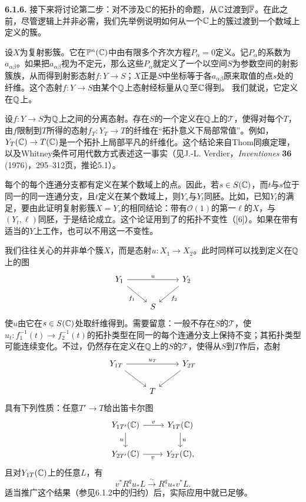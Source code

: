 \par\medskip\noindent\textbf{6.1.6.} 接下来将讨论第二步：对不涉及$\mathbb C$的拓扑的命题，从$\mathbb C$过渡到$\overline{\mathbb F}$。在此之前，尽管逻辑上并非必需，我们先举例说明如何从一个$\mathbb C$上的簇过渡到一个数域上定义的簇。

设$X$为复射影簇。它在$\mathbb P^n(\mathbb C)$中由有限多个齐次方程$P_\alpha=0$定义。记$P_\alpha$的系数为$a_{\alpha\beta}$。如果把$a_{\alpha\beta}$视为不定元，那么这些$P_\alpha$就定义了一个以空间$S$为参数空间的射影簇族，从而得到射影态射$f:Y\to S$；$X$正是$S$中坐标等于各$a_{\alpha\beta}$原来取值的点$s$处的纤维。这个态射$f:Y\to S$由某个$\mathbb Q$上态射经标量从$\mathbb Q$至$\mathbb C$得到。
我们就说，它定义在$\mathbb Q$上。

设$f:Y\to S$为$\mathbb Q$上之间的分离态射。存在$S$的一个定义在$\mathbb Q$上的$\mathcal T$，使得对每个$T$，由$f$限制到$T$所得的态射$f_T:Y_T\to T$的纤维在“拓扑意义下局部常值”。例如，$Y_T(\mathbb C)\to T(\mathbb C)$是一个拓扑上局部平凡的纤维化。这个结论来自Thom同痕定理，以及Whitney条件可用代数方式表述这一事实（见J.-L. Verdier，\emph{Inventiones} \textbf{36} (1976)，295--312页，推论5.1）。

每个的每个连通分支都有定义在某个数域上的点。因此，若$s\in S(\mathbb C)$，而$t$与$s$位于同一的同一连通分支，且$t$定义在某个数域上，则$Y_s$与$Y_t$同胚。比如，已知$Y_t$的满足，要由此证明复射影簇$X=Y_s$的相同结论：带有$\mathcal O(1)$的第一$\ell$的$X$，与$(Y_t,\ell)$同胚，于是结论成立。这个论证用到了的拓扑不变性（[6]）。如果在带有适当的$Y$上工作，也可以不用这一不变性。

我们往往关心的并非单个簇$X$，而是态射$u:X_1\to X_2$。此时同样可以找到定义在$\mathbb Q$上的图
\[
\begin{tikzcd}[ampersand replacement=\&]
Y_1\arrow[rr,"{u}"]\arrow[dr,"{f_1}"']\&\&Y_2\arrow[dl,"{f_2}"]\\
\&S\&
\end{tikzcd}
\]
使$u$由它在$s\in S(\mathbb C)$处取纤维得到。需要留意：一般不存在$S$的$\mathcal T$，使$u_t:f_1^{-1}(t)\to f_2^{-1}(t)$的拓扑类型在同一的每个连通分支上保持不变；其拓扑类型可能连续变化。不过，仍然存在定义在$\mathbb Q$上的$S$的$\mathcal T$，使得从$S$到$T$作后，态射
\[
\begin{tikzcd}[ampersand replacement=\&]
Y_{1T}\arrow[rr,"{u_T}"]\arrow[dr]\&\&Y_{2T}\arrow[dl]\\
\&T\&
\end{tikzcd}
\]
具有下列性质：任意$T'\to T$给出笛卡尔图
\[
\begin{tikzcd}[ampersand replacement=\&]
Y_{1T'}(\C)\arrow[r,"{v}"]\arrow[d,"{u}"']\&Y_{1T}(\C)\arrow[d,"{u}"]\\
Y_{2T'}(\C)\arrow[r,"{v}"']\&Y_{2T}(\C),
\end{tikzcd}
\]
且对$Y_{1T}(\mathbb C)$上的任意$L$，有
\[
v^*R^qu_*L\xrightarrow{\sim}R^qu_*v^*L.
\]
适当推广这个结果（参见6.1.2中的归约）后，实际应用中就已足够。

